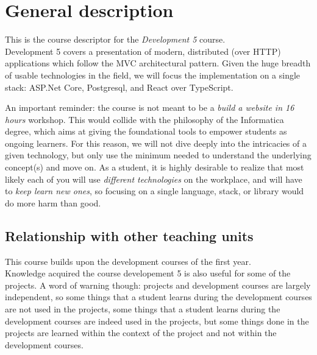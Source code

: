 \section{General description}
	This is the course descriptor for the \emph{Development 5} course.
\\
Development 5 covers a presentation of modern, distributed (over HTTP)
applications which follow the MVC architectural pattern. Given the huge
breadth of usable technologies in the field, we will focus the
implementation on a single stack: ASP.Net Core, Postgresql, and React
over TypeScript.

An important reminder: the course is not meant to be a \emph{build a
website in 16 hours} workshop. This would collide with the philosophy of
the Informatica degree, which aims at giving the foundational tools to
empower students as ongoing learners. For this reason, we will not dive
deeply into the intricacies of a given technology, but only use the
minimum needed to understand the underlying concept(s) and move on. As a
student, it is highly desirable to realize that most likely each of you
will use \emph{different technologies} on the workplace, and will have
to \emph{keep learn new ones}, so focusing on a single language, stack,
or library would do more harm than good.

	\subsection{Relationship with other teaching units}
		This course builds upon the development courses of the first year.	\\		
		Knowledge acquired the course developement 5 is also useful for some of the projects. A word of warning though: projects and development courses are largely independent, so some things that a student learns during the development courses are not used in the projects, some things that a student learns during the development courses are indeed used in the projects, but some things done in the projects are learned within the context of the project and not within the development courses.
